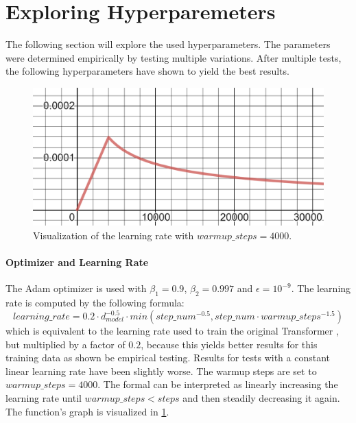 
\section{Exploring Hyperparemeters}

The following section will explore the used hyperparameters.
The parameters were determined empirically by testing multiple variations.
After multiple tests, the following hyperparameters have shown to yield the best results.

\begin{figure}[h]
\centering
\includegraphics[width=0.6\paperwidth]{figures/learning-rate}
\caption{Visualization of the learning rate with $warmup\_steps = 4000$.}
\label{fig:learning-rate}
\end{figure}

\paragraph{Optimizer and Learning Rate}

The Adam optimizer \cite{article} is used with $\beta_1=0.9$, $\beta_2=0.997$ and $\epsilon = 10^{-9}$.
The learning rate is computed by the following formula:
\[
	learning\_rate = 0.2 \cdot d_{model}^{-0.5} \cdot min(step\_num^{-0.5}, step\_num \cdot warmup\_steps^{-1.5})
\]
which is equivalent to the learning rate used to train the original Transformer \cite[p.~7]{1706.03762}, but multiplied by a factor of $0.2$, because this yields better results for this training data as shown be empirical testing.
Results for tests with a constant linear learning rate have been slightly worse.
The warmup steps are set to $warmup\_steps = 4000$.
The formal can be interpreted as linearly increasing the learning rate until $warmup\_steps < steps$ and then steadily decreasing it again.
The function's graph is visualized in \cref{fig:learning-rate}.

